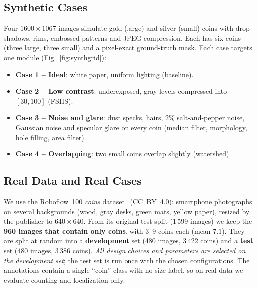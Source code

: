 \documentclass[conference,a4paper]{IEEEtran}
\begin{document}
\subsection{Synthetic Cases}
Four $1600\times1067$ images simulate gold (large) and silver (small) coins with drop shadows, rims, embossed patterns and JPEG compression. Each has six coins (three large, three small) and a pixel-exact ground-truth mask. Each case targets one module (Fig.~\ref{fig:synthgrid}):
\begin{itemize}
\item \textbf{Case 1 -- Ideal}: white paper, uniform lighting (baseline).
\item \textbf{Case 2 -- Low contrast}: underexposed, gray levels compressed into $[30,100]$ (FSHS).
\item \textbf{Case 3 -- Noise and glare}: dust specks, hairs, $2\%$ salt-and-pepper noise, Gaussian noise and specular glare on every coin (median filter, morphology, hole filling, area filter).
\item \textbf{Case 4 -- Overlapping}: two small coins overlap slightly (watershed).
\end{itemize}

\subsection{Real Data and Real Cases}
We use the Roboflow~100 \emph{coins} dataset~\cite{ciaglia2022rf100} (CC~BY~4.0): smartphone photographs on several backgrounds (wood, gray desks, green mats, yellow paper), resized by the publisher to $640\times640$. From its original test split (1\,599 images) we keep the \textbf{960 images that contain only coins}, with 3--9 coins each (mean $7.1$). They are split at random into a \textbf{development} set (480 images, 3\,422 coins) and a \textbf{test} set (480 images, 3\,386 coins). \emph{All design choices and parameters are selected on the development set}; the test set is run once with the chosen configurations. The annotations contain a single ``coin'' class with no size label, so on real data we evaluate counting and localization only.
\end{document}
